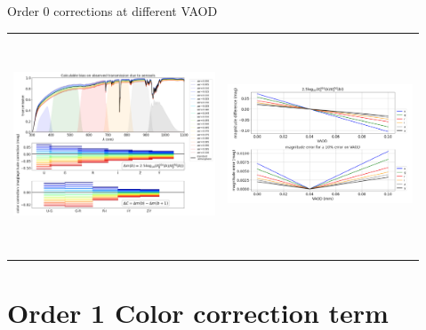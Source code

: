 \documentclass{beamer}
\begin{document}
\begin{frame}{Order 0 corrections at different VAOD}

\begin{tabular}{cc}
\includegraphics[width=6cm,height=6.5cm,angle=0]{figs/PCCorr/fig1_PCCorrOrder0th_aer.png} &
\includegraphics[width=5.5cm,height=6cm,angle=0]{figs/PCCorr/fig2_PCCorrOrder0th_aer.png}
\end{tabular}
\end{frame}




\section{Order 1 Color correction term}
\begin{frame}\sectionpage\end{frame}
\end{document}
